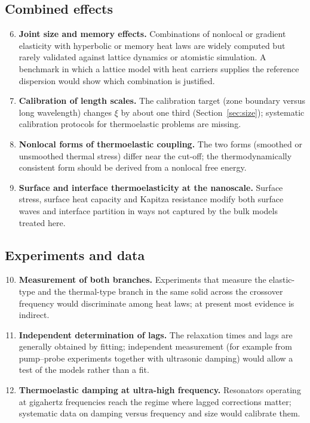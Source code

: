 \subsection{Combined effects}
\begin{enumerate}
\setcounter{enumi}{5}
\item \textbf{Joint size and memory effects.} Combinations of nonlocal or gradient elasticity with hyperbolic or memory heat laws are widely computed but rarely validated against lattice dynamics or atomistic simulation. A benchmark in which a lattice model with heat carriers supplies the reference dispersion would show which combination is justified.
\item \textbf{Calibration of length scales.} The calibration target (zone boundary versus long wavelength) changes $\xi$ by about one third (Section~\ref{sec:size}); systematic calibration protocols for thermoelastic problems are missing.
\item \textbf{Nonlocal forms of thermoelastic coupling.} The two forms (smoothed or unsmoothed thermal stress) differ near the cut-off; the thermodynamically consistent form should be derived from a nonlocal free energy.
\item \textbf{Surface and interface thermoelasticity at the nanoscale.} Surface stress, surface heat capacity and Kapitza resistance modify both surface waves and interface partition in ways not captured by the bulk models treated here.
\end{enumerate}
\subsection{Experiments and data}
\begin{enumerate}
\setcounter{enumi}{9}
\item \textbf{Measurement of both branches.} Experiments that measure the elastic-type and the thermal-type branch in the same solid across the crossover frequency would discriminate among heat laws; at present most evidence is indirect.
\item \textbf{Independent determination of lags.} The relaxation times and lags are generally obtained by fitting; independent measurement (for example from pump--probe experiments together with ultrasonic damping) would allow a test of the models rather than a fit.
\item \textbf{Thermoelastic damping at ultra-high frequency.} Resonators operating at gigahertz frequencies reach the regime where lagged corrections matter; systematic data on damping versus frequency and size would calibrate them.
\end{enumerate}

